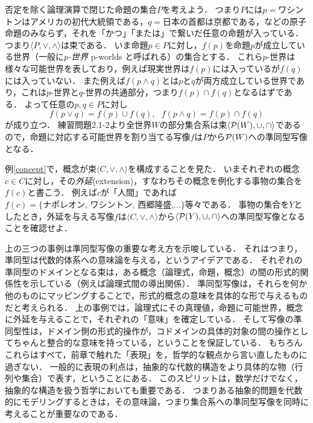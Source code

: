 \documentclass[11pt,a4paper]{jsarticle}
\begin{document}
\begin{example}[命題と可能世界]\label{p-worlds}
否定を除く論理演算で閉じた命題の集合$P$を考えよう．
つまり$P$には$p=$ワシントンはアメリカの初代大統領である，$q=$日本の首都は京都である，などの原子命題のみならず，それを「かつ」「または」で繋いだ任意の命題が入っている．つまり$\langle P, \vee, \wedge \rangle$は束である．
いま命題$p \in P$に対し，$f(p)$を命題$p$が成立している世界（一般に\emph{$p$-世界} p-worlds と呼ばれる）の集合とする．
これら$p$-世界は様々な可能世界を表しており，例えば現実世界は$f(p)$には入っているが$f(q)$には入っていない．
また例えば$f(p \wedge q)$とは$p$と$q$が両方成立している世界であり，これは$p$-世界と$q$-世界の共通部分，つまり$f(p) \cap f(q)$となるはずである．
よって任意の$p, q \in P$に対し
\[ f(p \vee q) = f(p) \cup f(q), \ \ \ f(p \wedge q) = f(p) \cap f(q) \]
が成り立つ．
練習問題2.1-2より全世界$W$の部分集合系は束$\langle \mathcal{P}(W), \cup, \cap \rangle$であるので，命題に対応する可能世界を割り当てる写像$f$は$P$から$\mathcal{P}(W)$への準同型写像となる．
\end{example}

\begin{example}[概念の外延] \label{extension}
例\ref{concept}で，概念が束$\langle C, \vee, \wedge \rangle$を構成することを見た．
いまそれぞれの概念$c \in C$に対し，その\emph{外延}(extension)，すなわちその概念を例化する事物の集合を$f(c)$と書こう．
例えば$c$が「人間」であれば$f(c)=\{\text{ナポレオン, ワシントン, 西郷隆盛,}\dots\}$等々である．
事物の集合を$Y$としたとき，外延を与える写像$f$は$\langle C, \vee, \wedge \rangle$から$\langle \mathcal{P}(Y), \cup, \cap \rangle$への準同型写像となることを確認せよ．
\end{example}

上の三つの事例は準同型写像の重要な考え方を示唆している．
それはつまり，準同型は代数的体系への意味論を与える，というアイデアである．
それぞれの準同型のドメインとなる束は，ある概念（論理式，命題，概念）の間の形式的関係性を示している（例えば論理式間の導出関係）．
準同型写像は，それらを何か他のものにマッピングすることで，形式的概念の意味を具体的な形で与えるものだと考えられる．
上の事例では，論理式にその真理値，命題に可能世界，概念に外延を与えることで，それぞれの「意味」を確定している．
そして写像の準同型性は，ドメイン側の形式的操作が，コドメインの具体的対象の間の操作としてちゃんと整合的な意味を持っている，ということを保証している．
もちろんこれらはすべて，前章で触れた「表現」を，哲学的な観点から言い直したものに過ぎない．
一般的に表現の利点は，抽象的な代数的構造をより具体的な物（行列や集合）で表す，ということにある．
このスピリットは，数学だけでなく，抽象的な構造を扱う哲学においても重要である．
つまりある抽象的問題を代数的にモデリングするときは，その意味論，つまり集合系への準同型写像を同時に考えることが重要なのである．
\end{document}

